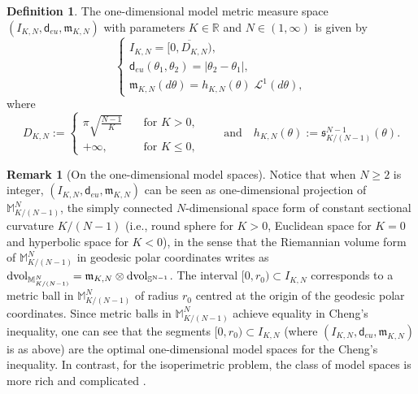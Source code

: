 \documentclass[12pt]{article}
\newcommand{\mm}{\mathfrak m}
\newcommand{\di}{\mathsf{d}}
\theoremstyle{plain}
\theoremstyle{definition}
\newtheorem{definition}[lemma]{Definition}
\newtheorem{remark}[lemma]{Remark}
\begin{document}
\begin{definition}\label{def: model space}
    The one-dimensional model metric measure space $(I_{K,N},\di_{eu},\mm_{K,N})$ with parameters $K\in \mathbb{R}$ and $N\in(1,\infty)$ is given by
    \begin{equation}
      \begin{cases}
        I_{K,N}=\overline{[0,D_{K,N})},\\
        \di_{eu}(\theta_1,\theta_2)=|\theta_2-\theta_1|,\\
        \mm_{K,N}(d\theta)=h_{K,N}(\theta)\; \mathcal{L}^1(d\theta),
    \end{cases}
    \end{equation}
where
 \begin{equation}
 D_{K,N}:=
  \begin{cases} \pi \sqrt{\frac{N-1}{K}} \quad &\textrm{for } K> 0,\\
+\infty, &\textrm{for } K\leq 0,
   \end{cases} \qquad \textrm{and} \quad  h_{K,N}(\theta):=\mathfrak{s}^{N-1}_{K/(N-1)}(\theta).
    \end{equation}
\end{definition}
%

\begin{remark}[On the one-dimensional model spaces]\label{Rem:1-DimModel} Notice that when $N\geq 2$ is integer, $( I_{K,N},   \di_{eu},  \mm_{K,N})$  can be seen as one-dimensional projection of $\mathbb{M}^N_{K/(N-1)}$,  the simply connected $N$-dimensional space form of constant sectional curvature $K/(N-1)$ (i.e., round sphere for $K>0$, Euclidean space for $K=0$ and hyperbolic space for $K<0$), in the sense that the Riemannian volume form of $\mathbb{M}^N_{K/(N-1)}$  in geodesic polar coordinates  writes as $\mathrm{dvol}_{\mathbb{M}^N_{K/(N-1)}}=  \mm_{K,N}  \otimes \rm{dvol}_{\mathbb{S}^{N-1}}$. The interval $[0,r_0)\subset I_{K,N}$ corresponds to a metric ball in $\mathbb{M}^N_{K/(N-1)}$ of radius $r_0$ centred at the origin of the geodesic polar coordinates.
Since metric balls in $\mathbb{M}^N_{K/(N-1)}$ achieve equality in Cheng's inequality, one can see that the segments $[0,r_0)\subset I_{K,N}$ (where  $(I_{K,N},\di_{eu},\mm_{K,N})$ is as above)  are the optimal one-dimensional model spaces for the Cheng's inequality. In contrast,  for the isoperimetric problem, the class of model spaces is more rich and complicated \cite{Milm-JEMS}.
\end{remark}
\end{document}
